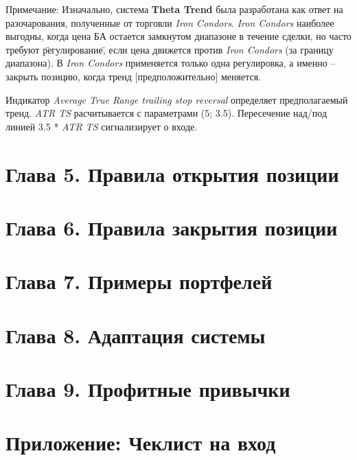 \documentclass[12pt,DIV=18]{scrartcl}
\begin{document}
\bigskip

Примечание: Изначально, система \textbf{Theta Trend} была разработана как ответ на разочарования, полученные от торговли \textit{Iron Condors}. \textit{Iron Condors} наиболее выгодны, когда цена БА остается замкнутом диапазоне в течение сделки, но часто требуют \"регулирование\", если цена движется против \textit{Iron Condors} (за границу диапазона). В \textit{Iron Condors} применяется только одна регулировка, а именно -- закрыть позицию, когда тренд [предположительно] меняется.

\bigskip

Индикатор \textit{Average  True  Range  trailing  stop  reversal} определяет предполагаемый тренд. \textit{ATR TS} расчитывается с параметрами (5; 3.5). Пересечение над/под  линией 3.5 * \textit{ATR TS} сигнализирует о входе.




















\section*{Глава 5. Правила открытия позиции}
\label{chapter5}

\section*{Глава 6. Правила закрытия позиции}
\label{chapter6}

\section*{Глава 7. Примеры портфелей}
\label{chapter7}

\section*{Глава 8. Адаптация системы}
\label{chapter8}

\section*{Глава 9. Профитные привычки}
\label{chapter9}


\appendix
\section*{Приложение: Чеклист на вход}
\label{appendix}
\end{document}
